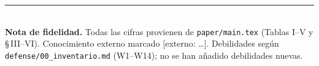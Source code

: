 \documentclass[11pt,a4paper]{article}
\newcommand{\externo}[1]{{\footnotesize\textcolor{red!55!black}{[externo: #1]}}}
\begin{document}
\vfill
\noindent\rule{\linewidth}{0.4pt}\\
{\footnotesize \textbf{Nota de fidelidad.} Todas las cifras provienen de \texttt{paper/main.tex}
(Tablas I--V y \S\,III--VI). Conocimiento externo marcado \externo{\ldots}. Debilidades según
\texttt{defense/00\_inventario.md} (W1--W14); no se han añadido debilidades nuevas.}
\end{document}
